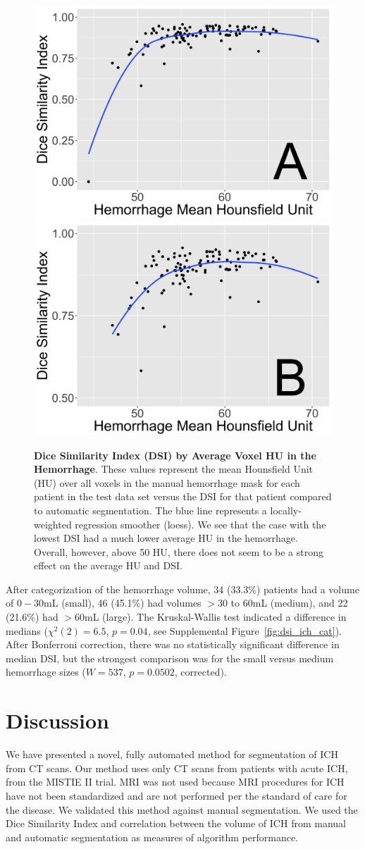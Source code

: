\documentclass{elsarticle_nonatbib}\usepackage[]{graphicx}\usepackage[]{color}
\begin{document}
\begin{figure}
\centering
\includegraphics[width=0.48\linewidth,keepaspectratio]{DSI_By_Mean_HU_A.png}
\includegraphics[width=0.48\linewidth,keepaspectratio]{DSI_By_Mean_HU_B.png}
\caption{{\bf Dice Similarity Index (DSI) by Average Voxel HU in the Hemorrhage}. These values represent the mean Hounsfield Unit (HU) over all voxels in the manual hemorrhage mask for each patient in the test data set versus the DSI for that patient compared to automatic segmentation.  The blue line represents a locally-weighted regression smoother (loess).  We see that the case with the lowest DSI had a much lower average HU in the hemorrhage.  Overall, however, above 50 HU, there does not seem to be a strong effect on the average HU and DSI.}
\label{fig:dsi_hu}
\end{figure}



After categorization of the hemorrhage volume, 34 (33.3\%) patients had a volume of $0-30$mL (small), 46 (45.1\%) had volumes $> 30$ to $60$mL (medium), and 22 (21.6\%) had $>60$mL (large).  The Kruskal-Wallis test indicated a difference in medians ($\chi^2(2) = 6.5
$, $p = 0.04$, see Supplemental Figure~\ref{fig:dsi_ich_cat}).  After Bonferroni correction, there was no statistically significant difference in median DSI, but the strongest comparison was for the small versus medium hemorrhage sizes ($W = 537
$, $p = 0.0502$, corrected).


\section{Discussion}
We have presented a novel, fully automated method for segmentation of ICH from CT scans. Our method uses only CT scans from patients with acute ICH, from the MISTIE II trial. MRI was not
used because MRI procedures for ICH have not been standardized and are not performed per the standard of care for the disease. We validated this method against manual segmentation.  We used the Dice Similarity Index and correlation between the volume of ICH from manual and automatic segmentation as measures of algorithm performance.
\end{document}
